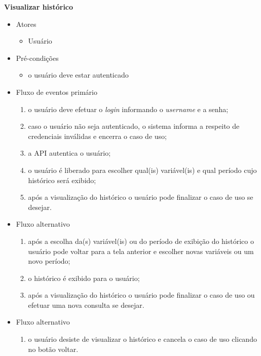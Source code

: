 \textbf{Visualizar histórico}

\begin{itemize}
    \item Atores
    \begin{itemize}
        \item Usuário
    \end{itemize}

    \item Pré-condições
    \begin{itemize}
        \item o usuário deve estar autenticado
    \end{itemize}

    \item Fluxo de eventos primário
    \begin{enumerate}
        \item o usuário deve efetuar o \textit{login} informando o \textit{username} e a senha;
        \item caso o usuário não seja autenticado, o sistema informa a respeito de credenciais inválidas e encerra o caso de uso;
        \item a API autentica o usuário;
        \item o usuário é liberado para escolher qual(is) variável(is) e qual período cujo histórico será exibido;
        \item após a visualização do histórico o usuário pode finalizar o caso de uso se desejar.
    \end{enumerate}

    \item Fluxo alternativo
    \begin{enumerate}
        \item após a escolha da(s) variável(is) ou do período de exibição do histórico o usuário pode voltar para a tela anterior e escolher novas variáveis ou um novo período;
        \item o histórico é exibido para o usuário;
        \item após a visualização do histórico o usuário pode finalizar o caso de uso ou efetuar uma nova consulta se desejar.
    \end{enumerate}

    \item Fluxo alternativo
    \begin{enumerate}
        \item o usuário desiste de visualizar o histórico e cancela o caso de uso clicando no botão voltar.
    \end{enumerate}
\end{itemize}

